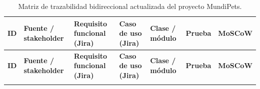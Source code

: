 \documentclass[journal,onecolumn]{IEEEtran}
\begin{document}
	\begin{longtable}{|c|p{2.6cm}|p{2.9cm}|p{2.9cm}|p{2.6cm}|p{1.8cm}|c|}
		\caption{Matriz de trazabilidad bidireccional actualizada del proyecto MundiPets.} \label{tab:matriz} \\
		\hline
		\textbf{ID} & \textbf{Fuente / stakeholder} & \textbf{Requisito funcional (Jira)} & \textbf{Caso de uso (Jira)} & \textbf{Clase / módulo} & \textbf{Prueba} & \textbf{MoSCoW} \\
		\hline
		\endfirsthead
		
		\hline
		\textbf{ID} & \textbf{Fuente / stakeholder} & \textbf{Requisito funcional (Jira)} & \textbf{Caso de uso (Jira)} & \textbf{Clase / módulo} & \textbf{Prueba} & \textbf{MoSCoW} \\
		\hline
		\endhead
		
		\hline
		\endfoot
		
		\hline
		\endlastfoot
		

\end{longtable}
\end{document}
